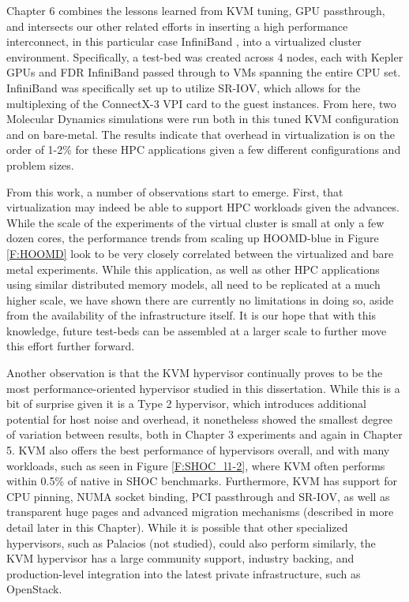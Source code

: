 Chapter 6 combines the lessons learned from KVM tuning, GPU passthrough, and intersects our other related efforts in inserting a high performance interconnect, in this particular case InfiniBand \cite{Musleh2014cloud}, into a virtualized cluster environment.  Specifically, a test-bed was created across 4 nodes, each with Kepler GPUs and FDR InfiniBand passed through to VMs spanning the entire CPU set. InfiniBand was specifically set up to utilize SR-IOV, which allows for the multiplexing of the ConnectX-3 VPI card to the guest instances. From here, two Molecular Dynamics simulations were run both in this tuned KVM configuration and on bare-metal.  The results indicate that overhead in virtualization is on the order of 1-2\% for these HPC applications given a few different configurations and problem sizes.   

From this work, a number of observations start to emerge. First, that virtualization may indeed be able to support HPC workloads given the advances. While the scale of the experiments of the virtual cluster is small at only a few dozen cores, the performance trends from scaling up HOOMD-blue in Figure \ref{F:HOOMD} look to be very closely correlated between the virtualized and bare metal experiments. While this application, as well as other HPC applications using similar distributed memory models, all need to be replicated at a much higher scale, we have shown there are currently no limitations in doing so, aside from the availability of the infrastructure itself.  It is our hope that with this knowledge, future test-beds can be assembled at a larger scale to further move this effort further forward.  

Another observation is that the KVM hypervisor continually proves to be the most performance-oriented hypervisor studied in this dissertation.  While this is a bit of surprise given it is a Type 2 hypervisor, which introduces additional potential for host noise and overhead, it nonetheless showed the smallest degree of variation between results, both in Chapter 3 experiments and again in Chapter 5.  KVM also offers the best performance of hypervisors overall, and with many workloads, such as seen in Figure \ref{F:SHOC_l1-2}, where KVM often performs within 0.5\% of native in SHOC benchmarks.  Furthermore, KVM has support for CPU pinning, NUMA socket binding, PCI passthrough and SR-IOV, as well as transparent huge pages and advanced migration mechanisms (described in more detail later in this Chapter).  While it is possible that other specialized hypervisors, such as Palacios \cite{lange2010palacios} (not studied), could also perform similarly, the KVM hypervisor has a large community support, industry backing, and production-level integration into the latest private infrastructure, such as OpenStack. 

